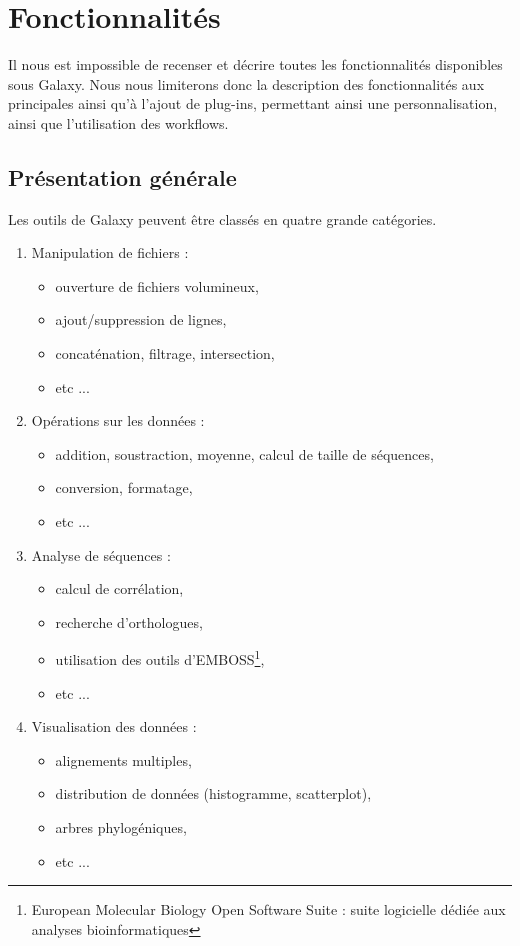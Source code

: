 \chapter{Fonctionnalités}

Il nous est impossible de recenser et décrire toutes les fonctionnalités disponibles sous Galaxy. Nous nous limiterons donc la description des fonctionnalités aux principales ainsi qu'à l'ajout de plug-ins, permettant ainsi une personnalisation, ainsi que l'utilisation des workflows.

\section{Présentation générale}

Les outils de Galaxy peuvent être classés en quatre grande catégories.
\begin{enumerate}
\item Manipulation de fichiers :
	\begin{itemize}
	\item ouverture de fichiers volumineux,
	\item ajout/suppression de lignes,
	\item concaténation, filtrage, intersection,
	\item etc ...
	\end{itemize}
\item Opérations sur les données :
	\begin{itemize}
	\item addition, soustraction, moyenne, calcul de taille de séquences,
	\item conversion, formatage,
	\item etc ...
	\end{itemize}
\item Analyse de séquences :
	\begin{itemize}
	\item calcul de corrélation,
	\item recherche d'orthologues,
	\item utilisation des outils d'EMBOSS\footnote{European Molecular Biology Open Software Suite : suite logicielle dédiée aux analyses bioinformatiques},
	\item etc ...
	\end{itemize}
\item Visualisation des données :
	\begin{itemize}
	\item alignements multiples,
	\item distribution de données (histogramme, scatterplot),
	\item arbres phylogéniques,
	\item etc ...
	\end{itemize}
\end{enumerate}

